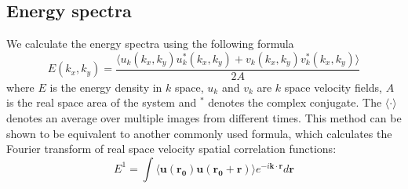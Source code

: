 \documentclass[preprint,aps,prl,amsmath,amssymb,longbibliography]{revtex4-2}
\begin{document}
\subsection{Energy spectra}
We calculate the energy spectra using the following formula
\begin{equation}
E(k_x, k_y) = \frac{\langle u_k(k_x, k_y)u^*_k(k_x, k_y)+v_k(k_x, k_y)v_k^*(k_x, k_y)\rangle}{2A}
\end{equation}
where $E$ is the energy density in $k$ space, $u_k$ and $v_k$ are $k$ space velocity fields, $A$ is the real space area of the system and $^*$ denotes the complex conjugate. The $\langle\cdot\rangle$ denotes an average over multiple images from different times. This method can be shown to be equivalent to another commonly used formula, which calculates the Fourier transform of real space velocity spatial correlation functions:
\begin{equation}
E^1 = \int \langle \boldsymbol{u}(\boldsymbol{r_0}) \boldsymbol{u}(\boldsymbol{r_0}+\boldsymbol{r}) \rangle
        e^{-i\boldsymbol{k}\cdot\boldsymbol{r}} d\boldsymbol{r}
\end{equation}
\end{document}
